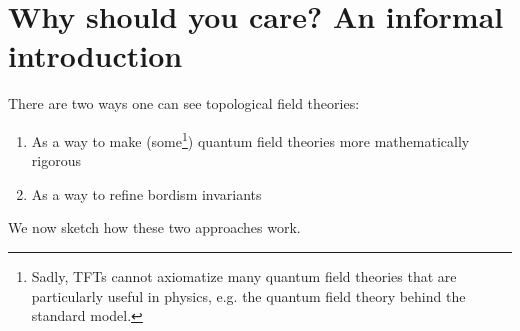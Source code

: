 \newpage
\clearpage
{}



\chapter{Why should you care? An informal introduction}
There are two ways one can see topological field theories:
\begin{enumerate}
    \item As a way to make (some\footnote{Sadly, TFTs cannot axiomatize many quantum field theories that are particularly useful in physics, e.g. the quantum field theory behind the standard model.}) quantum field theories more mathematically rigorous
    \item As a way to refine bordism invariants
\end{enumerate}
We now sketch how these two approaches work.
